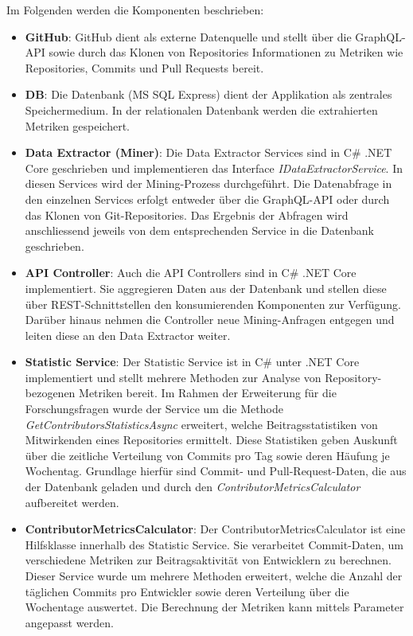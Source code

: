 Im Folgenden werden die Komponenten beschrieben:
\begin{itemize}
    \item \textbf{GitHub}: GitHub dient als externe Datenquelle und stellt über die GraphQL-API sowie durch das Klonen von Repositories Informationen zu Metriken wie Repositories, Commits und Pull Requests bereit.
    \item \textbf{DB}: Die Datenbank (MS SQL Express) dient der Applikation als zentrales Speichermedium. In der relationalen Datenbank werden die extrahierten Metriken gespeichert. 
    \item \textbf{Data Extractor (Miner)}: Die Data Extractor Services sind in C\# .NET Core geschrieben und implementieren das Interface \textit{IDataExtractorService}. In diesen Services wird der Mining-Prozess durchgeführt. Die Datenabfrage in den einzelnen Services erfolgt entweder über die GraphQL-API oder durch das Klonen von Git-Repositories. Das Ergebnis der Abfragen wird anschliessend jeweils von dem entsprechenden Service in die Datenbank geschrieben. 
    \item \textbf{API Controller}: Auch die API Controllers sind in C\# .NET Core implementiert. Sie aggregieren Daten aus der Datenbank und stellen diese über REST-Schnittstellen den konsumierenden Komponenten zur Verfügung. Darüber hinaus nehmen die Controller neue Mining-Anfragen entgegen und leiten diese an den Data Extractor weiter.
    \item \textbf{Statistic Service}: Der Statistic Service ist in C\# unter .NET Core implementiert und stellt mehrere Methoden zur Analyse von Repository-bezogenen Metriken bereit. Im Rahmen der Erweiterung für die Forschungsfragen wurde der Service um die Methode \textit{GetContributorsStatisticsAsync} erweitert, welche Beitragsstatistiken von Mitwirkenden eines Repositories ermittelt. Diese Statistiken geben Auskunft über die zeitliche Verteilung von Commits pro Tag sowie deren Häufung je Wochentag. Grundlage hierfür sind Commit- und Pull-Request-Daten, die aus der Datenbank geladen und durch den \textit{ContributorMetricsCalculator} aufbereitet werden.
    \item \textbf{ContributorMetricsCalculator}: Der ContributorMetricsCalculator ist eine Hilfsklasse innerhalb des Statistic Service. Sie verarbeitet Commit-Daten, um verschiedene Metriken zur Beitragsaktivität von Entwicklern zu berechnen. Dieser Service wurde um mehrere Methoden erweitert, welche die Anzahl der täglichen Commits pro Entwickler sowie deren Verteilung über die Wochentage auswertet. Die Berechnung der Metriken kann mittels Parameter angepasst werden. 

\end{itemize}
